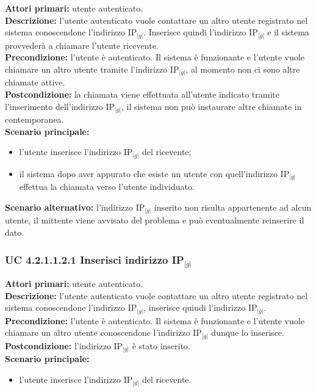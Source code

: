 \noindent
\textbf{Attori primari:} utente autenticato.\\
\textbf{Descrizione:} l'utente autenticato vuole contattare un altro utente registrato nel sistema conoscendone l'indirizzo IP$_{|g|}$. Inserisce quindi l'indirizzo IP$_{|g|}$ e il sistema provvederà a chiamare l'utente ricevente.\\
\textbf{Precondizione:} l'utente è autenticato. Il sistema è funzionante e l'utente vuole chiamare un altro utente tramite l'indirizzo IP$_{|g|}$, al momento non ci sono altre chiamate attive.\\
\textbf{Postcondizione:} la chiamata viene effettuata all'utente indicato tramite l'inserimento dell'indirizzo IP$_{|g|}$, il sistema non può instaurare altre chiamate in contemporanea.\\
\textbf{Scenario principale:}
\begin{itemize}
\item l'utente inserisce l'indirizzo IP$_{|g|}$ del ricevente;
\item il sistema dopo aver appurato che esiste un utente con quell'indirizzo IP$_{|g|}$ effettua la chiamata verso l'utente individuato.
\end{itemize}
\textbf{Scenario alternativo:} l'indirizzo IP$_{|g|}$ inserito non risulta appartenente ad alcun utente, il mittente viene avvisato del problema e può eventualmente reinserire il dato.

\subsubsection{UC 4.2.1.1.2.1 Inserisci indirizzo IP$_{|g|}$}
\noindent
\textbf{Attori primari:} utente autenticato.\\
\textbf{Descrizione:} l'utente autenticato vuole contattare un altro utente registrato nel sistema conoscendone l'indirizzo IP$_{|g|}$, inserisce quindi l'indirizzo IP$_{|g|}$.\\
\textbf{Precondizione:} l'utente è autenticato. Il sistema è funzionante e l'utente vuole chiamare un altro utente conoscendone l'indirizzo IP$_{|g|}$ dunque lo inserisce.\\
\textbf{Postcondizione:} l'indirizzo IP$_{|g|}$ è stato inserito.\\
\textbf{Scenario principale:}
\begin{itemize}
\item l'utente inserisce l'indirizzo IP$_{|g|}$ del ricevente.
\end{itemize}

